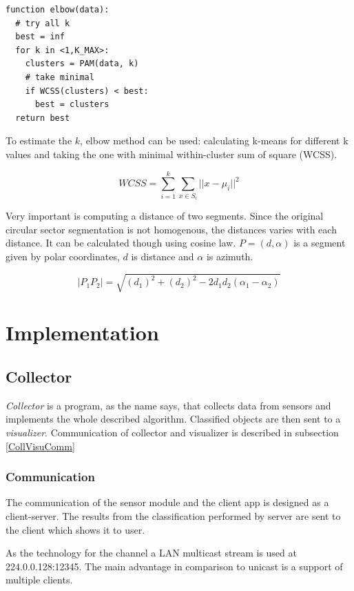 \begin{lstlisting}[style=python]
function elbow(data):
  # try all k
  best = inf
  for k in <1,K_MAX>:
    clusters = PAM(data, k)
    # take minimal
    if WCSS(clusters) < best:
      best = clusters
  return best
\end{lstlisting}

To estimate the $k$, elbow method can be used: calculating k-means for different k values and taking the one with
minimal within-cluster sum of square (WCSS).\cite{ClusterAnalysis} \cite{VagueNatureInformation}

$$\mathit{WCSS} = \sum_{i=1}^{k} \sum_{x \in S_i} ||x - \mu_i||^2$$

Very important is computing a distance of two segments. Since the original circular sector segmentation
is not homogenous, the distances varies with each distance. It can be calculated though using
cosine law. $P = (d, \alpha)$ is a segment given by polar coordinates, $d$ is distance and $\alpha$ is
azimuth.

$$|P_{1} P_{2}| = \sqrt{(d_{1})^{2} + (d_{2})^{2} - 2d_{1}d_{2}(\alpha_1 - \alpha_2)}$$




\chapter{Implementation}

\section{Collector}
{\it Collector} is a program, as the name says, that collects data from sensors and implements
the whole described algorithm. Classified objects are then sent to a {\it visualizer}.
Communication of collector and visualizer is described in subsection \ref{CollVisuComm}

\subsection*{Communication}
\label{CollVisuComm}
The communication of the sensor module and the client app is designed as a client-server. The results
from the classification performed by server are sent to the client which shows it to user.

As the technology for the channel a LAN multicast stream is used at 224.0.0.128:12345.
The main advantage in comparison to unicast is a support of multiple clients.


